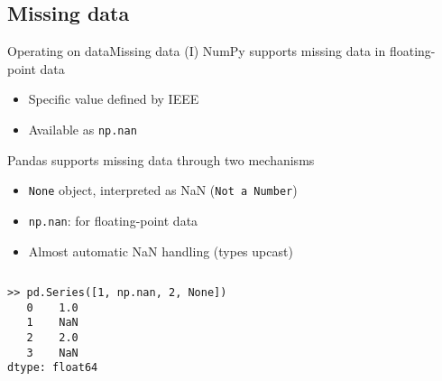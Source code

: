 \documentclass[10pt,compress]{beamer} %
\begin{document}
\subsection{Missing data}

\begin{frame}[fragile]{Operating on data}{Missing data (I)}
	NumPy supports missing data in floating-point data
	\begin{itemize}
		\item Specific value defined by IEEE
		\item Available as \texttt{np.nan}
	\end{itemize}
	Pandas supports missing data through two mechanisms
	\begin{itemize}
		\item \texttt{None} object, interpreted as NaN (\texttt{Not a Number})
		\item \texttt{np.nan}: for floating-point data
		\item Almost automatic NaN handling (types upcast)
	\end{itemize}

	\begin{columns}
		\begin{exampleblock}{}
		\vspace{-0.2cm} 
			\begin{lstlisting}
>> pd.Series([1, np.nan, 2, None])
   0    1.0
   1    NaN
   2    2.0
   3    NaN
dtype: float64
\end{lstlisting}
			\vspace{-0.2cm} 
		\end{exampleblock}
	\end{columns}
\end{frame}
\end{document}
